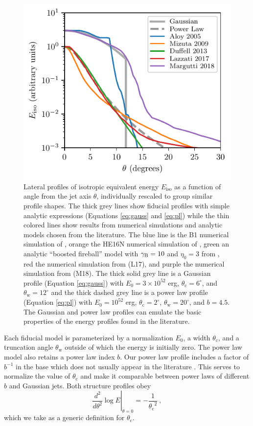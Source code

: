 \documentclass[twocolumn]{aastex62}
\newcommand{\thW}{\ensuremath{\theta_{\mathrm{w}}}}
\newcommand{\thC}{\ensuremath{\theta_{\mathrm{c}}}}
\newcommand{\Eiso}{\ensuremath{E_{\mathrm{iso}}}}
\begin{document}
\begin{figure}
	\includegraphics[width=\columnwidth]{figs/jetStructureComparison.pdf}
	\caption{Lateral profiles of isotropic equivalent energy $\Eiso$ as a function of angle from the jet axis $\theta$, individually rescaled to group similar profile shapes.  The thick grey lines show fiducial profiles with simple analytic expressions (Equations \eqref{eq:gauss} and \eqref{eq:pl}) while the thin colored lines show results from numerical simulations and analytic models chosen from the literature.  The blue line is the B1 numerical simulation of \cite{Aloy:2005aa}, orange the HE16N numerical simulation of \cite{Mizuta:2009aa}, green an analytic ``boosted fireball'' model with $\gamma_{\rm{B}}=10$ and $\eta_0=3$ from \cite{Duffell:2013aa}, red the numerical simulation from \cite{Lazzati:2017aa} (L17), and purple the numerical simulation from \cite{Margutti:2018aa} (M18).  The thick solid grey line is a Gaussian profile (Equation \eqref{eq:gauss}) with $E_0 = 3\times 10^{52}$ erg, $\thC = 6^\circ$, and $\thW=12^\circ$ and the thick dashed grey line is a power law profile (Equation \eqref{eq:pl}) with $E_0 = 10^{52}$ erg, $\thC = 2^\circ$, $\thW=20^\circ$, and $b=4.5$.  The Gaussian and power law profiles can emulate the basic properties of the energy profiles found in the literature. \label{fig:jetStruct}}
\end{figure}

Each fiducial model is parameterized by a normalization $E_0$, a width $\thC$, and a truncation angle $\thW$ outside of which the energy is initially zero.  The power law model also retains a power law index $b$.     Our power law profile includes a factor of $b^{-1}$ in the base which does not usually appear in the literature \citep{Granot:2003aa, Hotokezaka:2018aa}.  This serves to normalize the value of $\thC$ and make it comparable between power laws of different $b$ and Gaussian jets.  Both structure profiles obey
\begin{equation}
	\left . \frac{d^2}{d\theta^2} \log E \right \rvert_{\theta=0} = -\frac{1}{\thC^2}\ , \label{eq:thCdef}
\end{equation} 
which we take as a generic definition for $\thC$.
\end{document}
